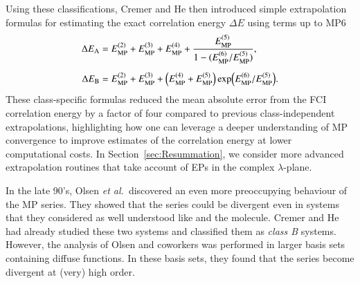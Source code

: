 \documentclass[aps,prb,reprint,noshowkeys,linenumbers,superscriptaddress]{revtex4-1}
\newcommand{\hugh}[1]{\textcolor{hughgreen}{#1}}
\newcommand{\latin}[1]{#1}
\newcommand{\ie}{\latin{i.e.}}
\newcommand{\Emp}{E_{\text{MP}}}
\begin{document}
\hugh{%
Using these classifications, Cremer and He then introduced simple extrapolation formulas for estimating the 
exact correlation energy $\Delta E$ using terms up to MP6\cite{Cremer_1996}
\begin{align}
\Delta E_{\text{A}}
    &= \Emp^{(2)} + \Emp^{(3)} + \Emp^{(4)}
     + \frac{\Emp^{(5)}}{1 - (\Emp^{(6)} / \Emp^{(5)})}, 
     \\[5pt]
\Delta E_{\text{B}} 
    &= \Emp^{(2)} + \Emp^{(3)} + \qty(\Emp^{(4)} + \Emp^{(5)}) \exp(\Emp^{(6)} / \Emp^{(5)}).
\end{align}
These class-specific formulas reduced the mean absolute error from the FCI correlation energy by a
factor of four compared to previous class-independent extrapolations,
highlighting how one can leverage a deeper understanding of MP convergence to improve estimates of 
the correlation energy at lower computational costs. 
In Section~\ref{sec:Resummation}, we consider more advanced extrapolation routines that take account of EPs in the complex $\lambda$-plane.
}


In the late 90's, Olsen \textit{et al.}~discovered an even more preoccupying behaviour of the MP series. \cite{Olsen_1996} 
They showed that the series could be divergent even in systems that they considered as well understood like  and the  molecule. \cite{Olsen_1996, Christiansen_1996} 
Cremer and He had already studied these two systems and classified them as \textit{class B} systems. 
However, the analysis of Olsen and coworkers was performed in larger basis sets containing diffuse functions. 
In these basis sets, they found that the series become divergent at (very) high order.
\end{document}
